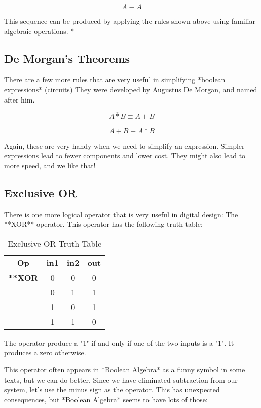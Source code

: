 \begin{equation}
    A \equiv A
\end{equation}

This sequence can be produced by applying the rules shown above using familiar
algebraic operations. 
*
\subsection{De Morgan's Theorems}

There are a few more rules that are very useful in simplifying *boolean
expressions* (circuits) They were developed by Augustus De Morgan, and named
after him.


\begin{equation}
    \overline{A * B}  \equiv \overline{A} + \overline{B}
\end{equation}

\begin{equation}
    \overline{A + B} \equiv \overline{A} * \overline{B}
\end{equation}

Again, these are very handy when we need to simplify an expression. Simpler
expressions lead to fewer components and lower cost. They might also lead to
more speed, and we like that!

\subsection{Exclusive OR}

There is one more logical operator that is very useful in digital design: The
**XOR** operator. This operator has the following truth table:

\begin{table}[tbp]
  \begin{tabular}{ |c|c|c|c| }
    \toprule
    \textbf{Op} & \textbf{in1} & \textbf{in2} & \textbf{out} \\
	  \textbf{**XOR} & 0 & 0 & 0 \\
	  & 0 & 1 & 1 \\
	  & 1 & 0 & 1 \\
	  & 1 & 1 & 0
  \end{tabular}
	\caption{Exclusive OR Truth Table}
\end{table}


The operator produce a "1" if and only if one of the two inputs is a "1". It
produces a zero otherwise.

This operator often appears in *Boolean Algebra* as a funny symbol in some
texts, but we can do better. Since we have eliminated subtraction from our
system, let's use the minus sign as the operator. This has unexpected
consequences, but *Boolean Algebra* seems to have lots of those:


